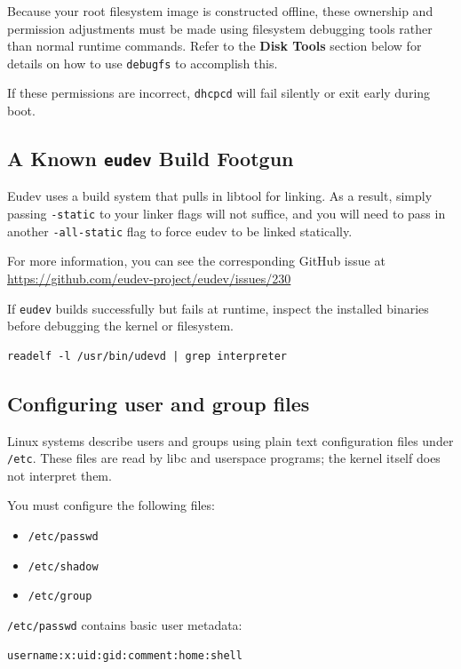 \documentclass{../juni}
\begin{document}
Because your root filesystem image is constructed offline, these ownership and
permission adjustments must be made using filesystem debugging tools rather
than normal runtime commands. Refer to the \textbf{Disk Tools} section below for
details on how to use \texttt{debugfs} to accomplish this.

If these permissions are incorrect, \texttt{dhcpcd} will fail silently or exit
early during boot.

\subsection{A Known \texttt{eudev} Build Footgun}

Eudev uses a build system that pulls in libtool for linking. As a result, simply
passing \texttt{-static} to your linker flags will not suffice, and you will
need to pass in another \texttt{-all-static} flag to force eudev to be linked
statically.

For more information, you can see the corresponding GitHub issue at
\url{https://github.com/eudev-project/eudev/issues/230}

If \texttt{eudev} builds successfully but fails at runtime, inspect the
installed binaries before debugging the kernel or filesystem.

\begin{verbatim}
readelf -l /usr/bin/udevd | grep interpreter
\end{verbatim}

\subsection{Configuring user and group files}

Linux systems describe users and groups using plain text configuration files
under \texttt{/etc}. These files are read by libc and userspace programs; the
kernel itself does not interpret them.

You must configure the following files:

\begin{itemize}
  \item \texttt{/etc/passwd}
  \item \texttt{/etc/shadow}
  \item \texttt{/etc/group}
\end{itemize}

\texttt{/etc/passwd} contains basic user metadata:
\begin{verbatim}
username:x:uid:gid:comment:home:shell
\end{verbatim}
\end{document}
